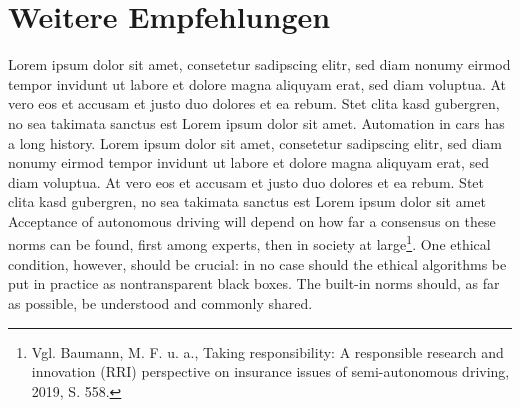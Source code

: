 \section{Weitere Empfehlungen}

Lorem ipsum dolor sit amet, consetetur sadipscing elitr, sed diam nonumy eirmod tempor invidunt ut labore et dolore magna aliquyam erat, sed diam voluptua. 
At vero eos et accusam et justo duo dolores et ea rebum. 
Stet clita kasd gubergren, no sea takimata sanctus est Lorem ipsum dolor sit amet. 
Automation in cars has a long history.  Lorem ipsum dolor sit amet, consetetur sadipscing elitr, sed diam nonumy eirmod tempor invidunt ut labore et dolore magna aliquyam erat, sed diam voluptua. 
At vero eos et accusam et justo duo dolores et ea rebum. 
Stet clita kasd gubergren, no sea takimata sanctus est Lorem ipsum dolor sit amet Acceptance of autonomous driving will depend on how far a consensus on these norms can be found, first among experts, then in society at large\footnote{Vgl. Baumann, M. F. u. a., Taking responsibility: A responsible research and innovation (RRI) perspective on insurance issues of semi-autonomous driving, 2019, S. 558.}. 
One ethical condition, however, should be crucial: in no case should the ethical algorithms be put in practice as nontransparent black boxes. 
The built-in norms should, as far as possible, be understood and commonly shared.

